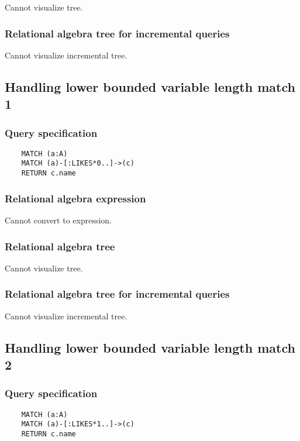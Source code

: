 	Cannot visualize tree.

	\subsubsection*{Relational algebra tree for incremental queries}

	Cannot visualize incremental tree.
	\subsection{Handling lower bounded variable length match 1}

	\subsubsection*{Query specification}

	\begin{lstlisting}
	MATCH (a:A)
	MATCH (a)-[:LIKES*0..]->(c)
	RETURN c.name
	\end{lstlisting}


	\subsubsection*{Relational algebra expression}

	Cannot convert to expression.

	\subsubsection*{Relational algebra tree}

	Cannot visualize tree.

	\subsubsection*{Relational algebra tree for incremental queries}

	Cannot visualize incremental tree.
	\subsection{Handling lower bounded variable length match 2}

	\subsubsection*{Query specification}

	\begin{lstlisting}
	MATCH (a:A)
	MATCH (a)-[:LIKES*1..]->(c)
	RETURN c.name
	\end{lstlisting}


